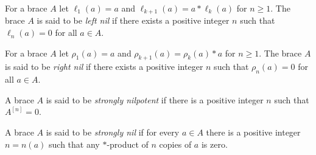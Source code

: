 \begin{definition}
For a brace $A$ let $\ell_1(a)=a$ and $\ell_{k+1}(a)=a*\ell_k(a)$ for
$n\geq1$.  The brace $A$ is said to be \emph{left nil} if there
exists a positive integer $n$ such that $\ell_n(a)=0$ for all $a\in A$. 
\end{definition}

\begin{definition}
For a brace $A$ let $\rho_1(a)=a$ and $\rho_{k+1}(a)=\rho_k(a)*a$ for
$n\geq1$.  The brace $A$ is said to be \emph{right nil} if there
exists a positive integer $n$ such that $\rho_n(a)=0$ for all $a\in A$. 
\end{definition}



\begin{definition}
A brace $A$ is said to be \emph{strongly nilpotent}
if there is a positive integer $n$ such that $A^{[n]}=0$.
\end{definition}

\begin{definition}
    A brace $A$ is said to be \emph{strongly nil} if for every
    $a\in A$ there is a positive integer $n=n(a)$ such that any $*$-product of
    $n$ copies of $a$ is zero.
\end{definition}


%
%

